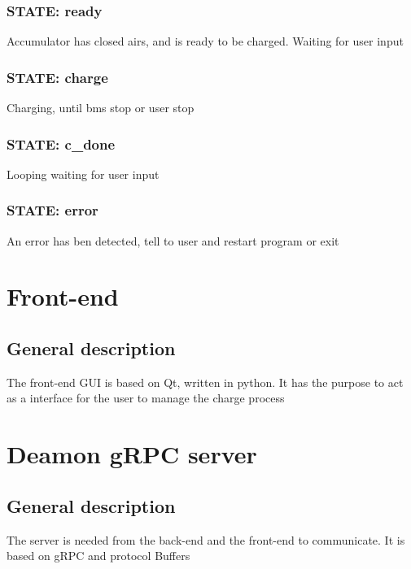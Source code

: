 \documentclass[a4paper]{report}
\begin{document}
  \subsection{STATE: ready}
  Accumulator has closed airs, and is ready to be charged. Waiting for user input
  \subsection{STATE: charge}
  Charging, until bms stop or user stop
  \subsection{STATE: c\_done}
  Looping waiting for user input
  \subsection{STATE: error}
  An error has ben detected, tell to user and restart program or exit

  \chapter{Front-end}
  \section{General description}
  The front-end GUI is based on Qt, written in python. It has the purpose to act as a interface for the user to manage the charge process

  \chapter{Deamon gRPC server}
  \section{General description}
  The server is needed from the back-end and the front-end to communicate. It is based on gRPC and protocol Buffers
\end{document}
